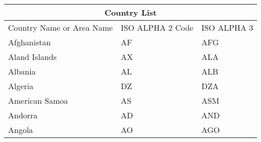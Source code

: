 \documentclass{article}
\begin{document}
	{
		\begin{tabular}{ |p{3cm}|p{3cm}|p{3cm}|  }
			\hline
			\multicolumn{3}{|c|}{Country List} \\
			\hline
			Country Name or Area Name& ISO ALPHA 2 Code &ISO ALPHA 3 \\
			\hline
			Afghanistan & AF &AFG \\
			Aland Islands & AX   & ALA \\
			Albania &AL & ALB \\
			Algeria    &DZ & DZA \\
			American Samoa & AS & ASM \\
			Andorra & AD & AND   \\
			Angola & AO & AGO \\
			\hline
	\end{tabular}}
\end{document}
